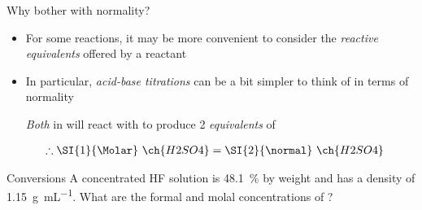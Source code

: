 \documentclass[notes=hide]{beamer}
\begin{document}
\begin{frame}{Why bother with normality?}
	\begin{itemize}
		\item For some reactions, it may be more convenient to consider
			the \emph{reactive equivalents} offered by a reactant
		\item In particular, \emph{acid-base titrations} can be a bit
			simpler to think of in terms of normality

			\begin{center}
			\end{center}

			\emph{Both}  in  will react with
			 to produce 2 \emph{equivalents} of 

			\begin{align*}
				\therefore \SI{1}{\Molar}~\ch{H2SO4} &=
				\SI{2}{\normal}~\ch{H2SO4}
			\end{align*}
	\end{itemize}
\end{frame}

\begin{frame}[t]{Conversions}
	A concentrated HF solution is \SI{48.1}{\percent} by weight  and
	has a density of \SI{1.15}{\gram\per\milli\liter}. What are the formal
	and molal concentrations of ?


\end{frame}
\end{document}
